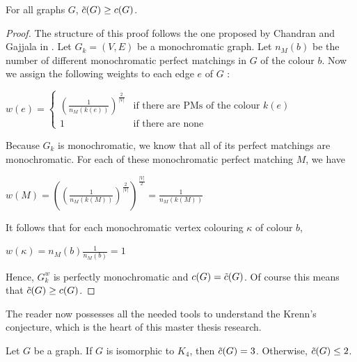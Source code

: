 \begin{observation}
    \label{obs:c_tilde_greater_than_c}
    For all graphs $G$, $\Tilde{c}(G) \geq c(G)$.
\end{observation}

\begin{proof}
    The structure of this proof follows the one proposed by Chandran and Gajjala in \cite{chandran}. Let $G_k = (V, E)$ be a monochromatic graph. Let $n_{M}(b)$ be the number of different monochromatic perfect matchings in $G$ of the colour $b$. Now we assign the following weights to each edge $e$ of $G$ :
    
    \begin{center}
        $w(e) = \left\{
        \begin{array}{ll}
            \left(\frac{1}{n_{M}(k(e))}\right)^{\frac{2}{|V|}} & \mbox{if there are PMs of the colour } k(e) \\
            1 & \mbox{if there are none}
        \end{array}
        \right.$
    \end{center}

    Because $G_k$ is monochromatic, we know that all of its perfect matchings are monochromatic. For each of these monochromatic perfect matching $M$, we have 
    
    \begin{center}
        $w(M) = \left( (\frac{1}{n_{M}(k(M))})^{\frac{2}{|V|}}\right)^{\frac{|V|}{2}} = \frac{1}{n_{M}(k(M))}$
    \end{center}
    
    It follows that for each monochromatic vertex colouring $\kappa$ of colour $b$,
    
    \begin{center}
        $w(\kappa) = n_{M}(b)\frac{1}{n_{M}(b)} = 1$
    \end{center}
    
    Hence, $G_k^w$ is perfectly monochromatic and $c(G) = \Tilde{c}(G)$. Of course this means that $\Tilde{c}(G) \geq c(G)$.
\end{proof}

The reader now possesses all the needed tools to understand the Krenn's conjecture, which is the heart of this master thesis research.

\begin{conjecture}
    \label{con:krenn}
    Let $G$ be a graph. If $G$ is isomorphic to $K_4$, then $\Tilde{c}(G) = 3$. Otherwise, $\Tilde{c}(G) \leq 2$.
\end{conjecture}

